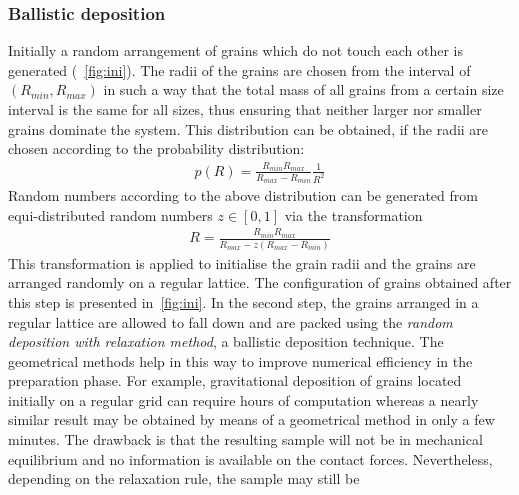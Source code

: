 \subsubsection{Ballistic deposition}
Initially a random arrangement of grains which do not touch each other is 
generated 
(~\cref{fig:ini}). The radii of the grains are chosen from the interval of 
$(\mathit{R}_{\mathit{min}},\mathit{R}_{\mathit{max}})$ in such a way that the 
total mass of all 
grains from a certain size interval is the same for all sizes, thus ensuring 
that neither 
larger 
nor smaller grains dominate the system. This distribution can be obtained, 
if the radii are 
chosen according to the probability distribution:
\begin{align}
\mathit{p}(\mathit{R})=\frac{\mathit{R}_{\mathit{min}}\mathit{R}_{\mathit{max}}}{\mathit{R}_{\mathit{max}}
 - \mathit{R}_{\mathit{min}}} \frac{1}{\mathit{R}^{2}}
\end{align}
Random numbers according to the above distribution can be generated from 
equi-distributed random 
numbers $\mathit{z}\in [0,1]$ via the transformation
\begin{align}
\mathit{R}=\frac{\mathit{R}_{\mathit{min}}\mathit{R}_{\mathit{max}}}{\mathit{R}_{\mathit{max}}
 - 
z(\mathit{R}_{\mathit{max}} - \mathit{R}_{\mathit{min}})}
\end{align}
This transformation is applied to initialise the grain radii and the 
grains are arranged 
randomly on a regular lattice. The configuration of grains obtained after 
this step is 
presented 
in~\cref{fig:ini}.
In the second step, the grains arranged in a regular lattice are allowed to 
fall down and are 
packed using the \textit{random deposition with relaxation method}, a ballistic 
deposition 
technique. The geometrical methods help in this way to improve numerical 
efficiency in the 
preparation phase. For example, gravitational deposition of grains located 
initially on a 
regular grid can require hours of computation whereas a nearly similar result 
may be obtained by 
means of a geometrical method in only a few minutes. The drawback is that the 
resulting sample 
will 
not be in mechanical equilibrium and no information is available on the contact 
forces. 
Nevertheless, depending on the relaxation rule, the sample may still be 
